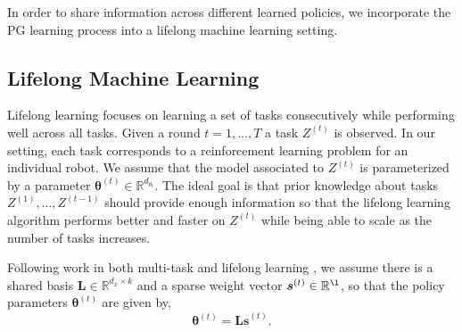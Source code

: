 \documentclass{aamas2016}
\renewcommand{\Re}{\mathbb{R}}
\newcommand{\note}[3]{{\color{#2} [ \ding{42} \textbf{#1:} {\small #3} ]}}
\newcommand{\comEric}[1]{\note{Eric}{blue}{#1}}
\begin{document}
In order to share information across different learned policies, we incorporate the PG learning process into a lifelong machine learning 
setting.





\subsection{Lifelong Machine Learning}


Lifelong learning focuses on learning a set of tasks consecutively while performing well across all tasks. Given a round $t = 1,\dots,T$ a task $Z^{(t)}$ is observed. %
In our setting, each task corresponds to a reinforcement learning problem for an individual robot. We assume that the model associated to $Z^{(t)}$ is parameterized by a parameter $\boldsymbol{\theta}^{(t)} \in \Re^{d_{\theta_{t}}}$. The ideal goal is that prior knowledge about tasks $Z^{(1)},\ldots,Z^{(t-1)}$ should provide enough information so that the lifelong learning algorithm performs better and faster on $Z^{(t)}$ while being able to scale as the number of tasks increases.

Following work in both multi-task \cite{Kumar-2012} and lifelong learning \cite{Ruvolo2013}, we assume there is a shared basis $\boldsymbol{L}\in \Re^{d_{x}\times k}$ and a sparse weight vector $\boldsymbol{s}^{(t)}\in \Re^{\l}$, so that the policy parameters $\boldsymbol{\theta}^{(t)}$
are given by,
\begin{displaymath}
 \boldsymbol{\theta}^{(t)}=\boldsymbol{Ls}^{(t)}.
\end{displaymath}
\end{document}
